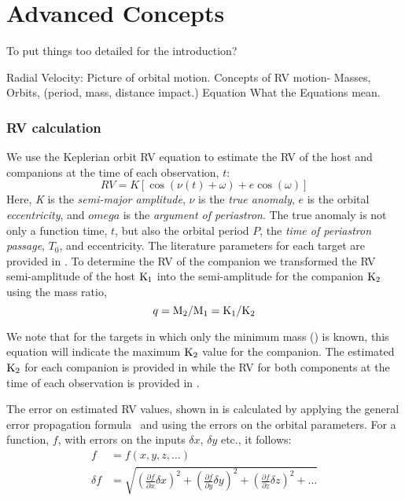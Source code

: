
\chapter{Advanced Concepts}
\label{cha:concepts}
To put things too detailed for the introduction?


Radial Velocity:
Picture of orbital motion.
Concepts of {RV} motion-
Masses,
Orbits, (period, mass, distance impact.)
Equation
What the Equations mean.

\subsection{{RV} calculation}
We use the Keplerian orbit {RV} equation to estimate the {RV} of the host and companions at the time of each observation, \(t\):
\begin{equation}
\label{eq:rv_equation}
{RV} = K [\cos{(\nu(t) + \omega)} + e\cos{(\omega)}]
\end{equation}
Here, \emph{K} is the \emph{semi-major amplitude}, \(\nu\) is the \emph{true anomaly}, \(e\) is the orbital \emph{eccentricity}, and \(omega\) is the \emph{argument of periastron}.
The true anomaly is not only a function time, \(t\), but also the orbital period \(P\), the \emph{time of periastron passage}, \(T_0\), and eccentricity.
The literature parameters for each target are provided in .
To determine the {RV} of the companion we transformed the {RV} semi-amplitude of the host \(\textrm{K}_{1}\) into the semi-amplitude for the companion \(\textrm{K}_{2}\) using the mass ratio,
\begin{equation}
\label{eqn:mass_ratio}
q = \textrm{M}_{2} / \textrm{M}_{1} = \textrm{K}_{1} / \textrm{K}_{2}
\end{equation}

We note that for the targets in which only the minimum mass (\mtwosini) is known, this equation will indicate the maximum \(\textrm{K}_{2}\) value for the companion. The estimated \(\textrm{K}_{2}\) for each companion is provided in  while the {RV} for both components at the time of each observation is provided in .

The error on estimated {RV} values, shown in  is calculated by applying the general error propagation formula~\citep{ku_notes_1966} and using the  errors on the orbital parameters. For a function, \(f\), with errors on the inputs \(\delta x\), \(\delta y\) etc., it follows:
\begin{align}
f &= f(x, y, z, \ldots)\\
\delta f &= \sqrt{{\left( \frac{\partial f}{\partial x} \delta x\right)}^2 + {\left(\frac{\partial f}{\partial y} \delta y\right)}^2 + {\left(\frac{\partial f}{\partial z} \delta z\right)}^2 + \ldots}
\end{align}

